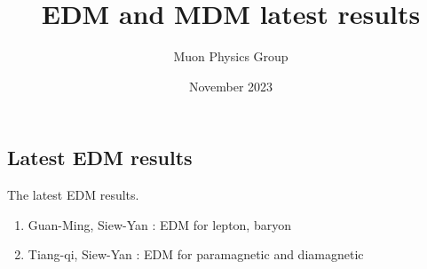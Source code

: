 \documentclass[12pt]{article}
\title{EDM and MDM latest results}
\author{Muon Physics Group}
\date{November 2023}
\begin{document}
\begin{landscape}

\section{Latest EDM results}

\noindent The latest EDM results.
\begin{enumerate}
\item Guan-Ming, Siew-Yan : EDM for lepton, baryon
\item Tiang-qi, Siew-Yan  : EDM for paramagnetic and diamagnetic
\end{enumerate}


\end{landscape}
\end{document}

